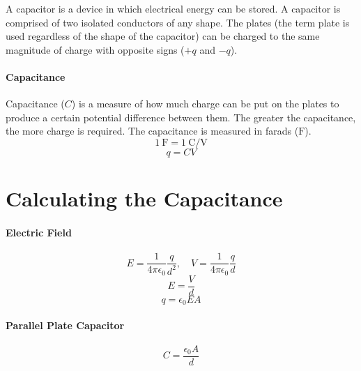 \documentclass{article}
\begin{document}
        A capacitor is a device in which electrical energy can be stored. A capacitor is comprised of two isolated conductors of any shape. The plates (the term plate is used regardless of the shape of the capacitor) can be charged to the same magnitude of charge with opposite signs ($+q$ and $-q$).

        \paragraph{Capacitance} Capacitance ($C$) is a measure of how much charge can be put on the plates to produce a certain potential difference between them. The greater the capacitance, the more charge is required. The capacitance is measured in farads ($\si{\farad}$).
        \begin{equation}
            \SI{1}{\farad} = \SI[per-mode=fraction]{1}{\coulomb\per\volt}
        \end{equation}
        \begin{equation}
            q = C V
        \end{equation}

    \section{Calculating the Capacitance}

        \paragraph{Electric Field}
        \begin{equation}
            E = \frac{1}{4\pi\epsilon_0} \frac{q}{d^2}, \quad V = \frac{1}{4\pi\epsilon_0} \frac{q}{d} \nonumber
        \end{equation}
        \begin{equation}
            E = \frac{V}{d}
        \end{equation}
        \begin{equation}
            q = \epsilon_0 E A
        \end{equation}

        \paragraph{Parallel Plate Capacitor}
        \begin{equation}
            C = \frac{\epsilon_0 A}{d}
        \end{equation}
\end{document}
